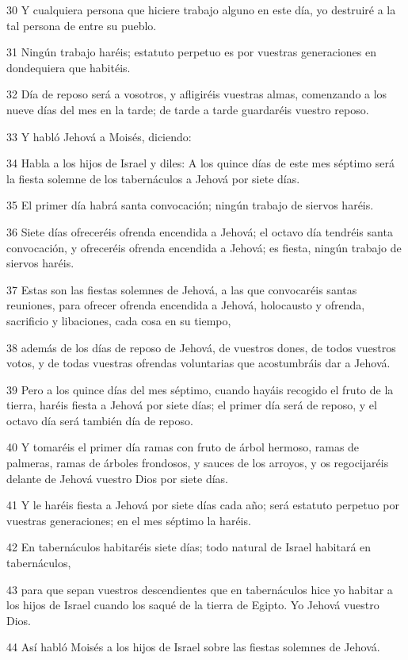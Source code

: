 \par 30 Y cualquiera persona que hiciere trabajo alguno en este día, yo destruiré a la tal persona de entre su pueblo.
\par 31 Ningún trabajo haréis; estatuto perpetuo es por vuestras generaciones en dondequiera que habitéis.
\par 32 Día de reposo será a vosotros, y afligiréis vuestras almas, comenzando a los nueve días del mes en la tarde; de tarde a tarde guardaréis vuestro reposo.
\par 33 Y habló Jehová a Moisés, diciendo:
\par 34 Habla a los hijos de Israel y diles: A los quince días de este mes séptimo será la fiesta solemne de los tabernáculos a Jehová por siete días.
\par 35 El primer día habrá santa convocación; ningún trabajo de siervos haréis.
\par 36 Siete días ofreceréis ofrenda encendida a Jehová; el octavo día tendréis santa convocación, y ofreceréis ofrenda encendida a Jehová; es fiesta, ningún trabajo de siervos haréis.
\par 37 Estas son las fiestas solemnes de Jehová, a las que convocaréis santas reuniones, para ofrecer ofrenda encendida a Jehová, holocausto y ofrenda, sacrificio y libaciones, cada cosa en su tiempo,
\par 38 además de los días de reposo de Jehová, de vuestros dones, de todos vuestros votos, y de todas vuestras ofrendas voluntarias que acostumbráis dar a Jehová.
\par 39 Pero a los quince días del mes séptimo, cuando hayáis recogido el fruto de la tierra, haréis fiesta a Jehová por siete días; el primer día será de reposo, y el octavo día será también día de reposo.
\par 40 Y tomaréis el primer día ramas con fruto de árbol hermoso, ramas de palmeras, ramas de árboles frondosos, y sauces de los arroyos, y os regocijaréis delante de Jehová vuestro Dios por siete días.
\par 41 Y le haréis fiesta a Jehová por siete días cada año; será estatuto perpetuo por vuestras generaciones; en el mes séptimo la haréis.
\par 42 En tabernáculos habitaréis siete días; todo natural de Israel habitará en tabernáculos,
\par 43 para que sepan vuestros descendientes que en tabernáculos hice yo habitar a los hijos de Israel cuando los saqué de la tierra de Egipto. Yo Jehová vuestro Dios.
\par 44 Así habló Moisés a los hijos de Israel sobre las fiestas solemnes de Jehová.


